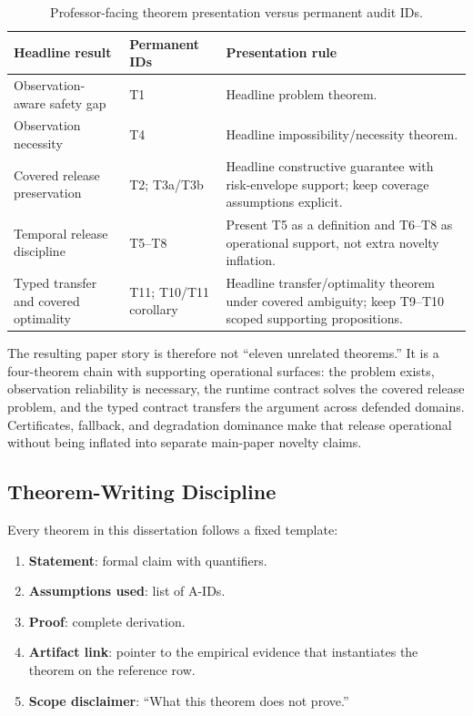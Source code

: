 \begin{table}[htbp]
\centering
\caption{Professor-facing theorem presentation versus permanent audit IDs.}
\label{tab:main-result-arc}
\begin{tabular}{p{}p{}p{}}
\toprule
\textbf{Headline result} & \textbf{Permanent IDs} & \textbf{Presentation rule} \\
\midrule
Observation-aware safety gap & T1 & Headline problem theorem. \\
Observation necessity & T4 & Headline impossibility/necessity theorem. \\
Covered release preservation & T2; T3a/T3b & Headline constructive guarantee with risk-envelope support; keep coverage assumptions explicit. \\
Temporal release discipline & T5--T8 & Present T5 as a definition and T6--T8 as operational support, not extra novelty inflation. \\
Typed transfer and covered optimality & T11; T10/T11 corollary & Headline transfer/optimality theorem under covered ambiguity; keep T9--T10 scoped supporting propositions. \\
\bottomrule
\end{tabular}
\end{table}

The resulting paper story is therefore not ``eleven unrelated theorems.''  It is
a four-theorem chain with supporting operational surfaces: the problem exists,
observation reliability is necessary, the runtime contract solves the covered
release problem, and the typed contract transfers the argument across defended
domains.  Certificates, fallback, and degradation dominance make that release
operational without being inflated into separate main-paper novelty claims.

\subsection{Theorem-Writing Discipline}

Every theorem in this dissertation follows a fixed template:

\begin{enumerate}
  \item \textbf{Statement}: formal claim with quantifiers.
  \item \textbf{Assumptions used}: list of A-IDs.
  \item \textbf{Proof}: complete derivation.
  \item \textbf{Artifact link}: pointer to the empirical evidence that
    instantiates the theorem on the reference row.
  \item \textbf{Scope disclaimer}: ``What this theorem does not prove.''
\end{enumerate}

